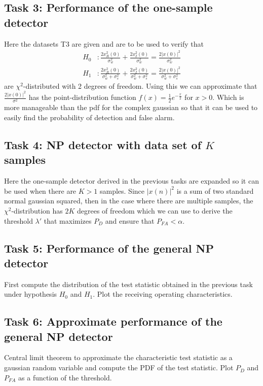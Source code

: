 \subsection{Task 3: Performance of the one-sample detector}
Here the datasets T3 are given and are to be used to verify that
\begin{align}
	H_0 &: \frac{2x_R^2(0)}{\sigma_w^2}+\frac{2x_I^2(0)}{\sigma_w^2}=\frac{2|x(0)|^2}{\sigma_w^2}\label{eq:chi_sq_h0}\\
	H_1 &: \frac{2x_R^2(0)}{\sigma_w^2+\sigma_s^2}+\frac{2x_I^2(0)}{\sigma_w^2+\sigma_s^2}=\frac{2|x(0)|^2}{\sigma_w^2+\sigma_s^2}\label{eq:chi_sq_h1}
\end{align}
are $\chi^2$-distributed with 2 degrees of freedom. Using this we can approximate that $\frac{2|x(0)|^2}{\sigma^2}$ has the point-distribution function $f(x) = \frac{1}{2}e^{-\frac{x}{2}}$ for $x>0$. Which is more manageable than the pdf for the complex gaussian so that it can be used to easily find the probability of detection and false alarm.

\subsection{Task 4: NP detector with data set of $K$ samples}
Here the one-sample detector derived in the previous tasks are expanded so it can be used when there are $K>1$ samples. Since $|x(n)|^2$ is a sum of two standard normal gaussian squared, then in the case where there are multiple samples, the $\chi^2$-distribution has $2K$ degrees of freedom which we can use to derive the threshold $\lambda'$ that maximizes $P_D$ and ensure that $P_{FA}<\alpha$.

\subsection{Task 5: Performance of the general NP detector}
First compute the distribution of the test statistic obtained in the previous task under hypothesis $H_0$ and $H_1$. Plot the receiving operating characteristics.

\subsection{Task 6: Approximate performance of the general NP detector}
Central limit theorem to approximate the characteristic test statistic as a gaussian random variable and compute the PDF of the test statistic. Plot $P_D$ and $P_{FA}$ as a function of the threshold.

